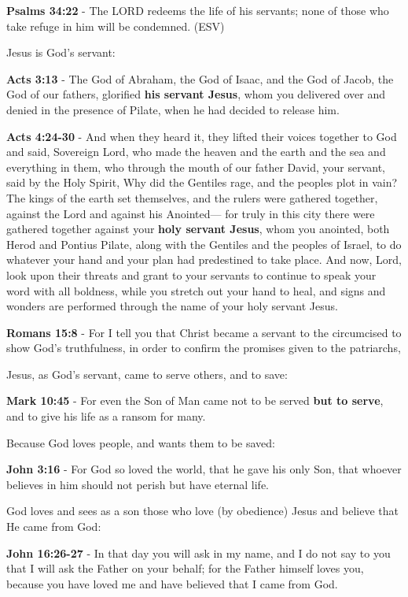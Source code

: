 \documentclass[11pt]{article}
\begin{document}
\textbf{Psalms 34:22} - The LORD redeems the life of his servants; none of those who take refuge in him will be condemned. (ESV)

Jesus is God's servant:

\textbf{Acts 3:13} - The God of Abraham, the God of Isaac, and the God of Jacob, the God of our fathers, glorified \textbf{his servant Jesus}, whom you delivered over and denied in the presence of Pilate, when he had decided to release him.

\textbf{Acts 4:24-30} - And when they heard it, they lifted their voices together to God and said, Sovereign Lord, who made the heaven and the earth and the sea and everything in them, who through the mouth of our father David, your servant, said by the Holy Spirit, Why did the Gentiles rage, and the peoples plot in vain?  The kings of the earth set themselves, and the rulers were gathered together, against the Lord and against his Anointed— for truly in this city there were gathered together against your \textbf{holy servant Jesus}, whom you anointed, both Herod and Pontius Pilate, along with the Gentiles and the peoples of Israel, to do whatever your hand and your plan had predestined to take place.  And now, Lord, look upon their threats and grant to your servants to continue to speak your word with all boldness, while you stretch out your hand to heal, and signs and wonders are performed through the name of your holy servant Jesus.

\textbf{Romans 15:8} - For I tell you that Christ became a servant to the circumcised to show God's truthfulness, in order to confirm the promises given to the patriarchs,

Jesus, as God's servant, came to serve others, and to save:

\textbf{Mark 10:45} - For even the Son of Man came not to be served \textbf{but to serve}, and to give his life as a ransom for many.

Because God loves people, and wants them to be saved:

\textbf{John 3:16} - For God so loved the world, that he gave his only Son, that whoever believes in him should not perish but have eternal life.

God loves and sees as a son those who love (by obedience) Jesus and believe that He came from God:

\textbf{John 16:26-27} - In that day you will ask in my name, and I do not say to you that I will ask the Father on your behalf; for the Father himself loves you, because you have loved me and have believed that I came from God.
\end{document}
